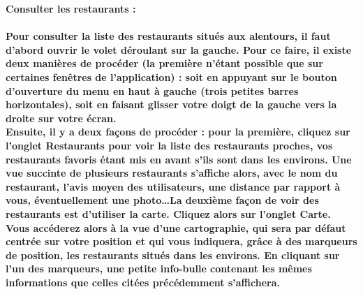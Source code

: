\begin{description}
    \item \bf{Consulter les restaurants :} \\ \\
        Pour consulter la liste des restaurants situés aux alentours, il faut d'abord ouvrir le volet déroulant sur la gauche. Pour ce faire, il existe deux manières de procéder (la première n'étant possible que sur certaines fenêtres de l’application) : soit en appuyant sur le bouton d'ouverture du menu en haut à gauche (trois petites barres horizontales), soit en faisant glisser votre doigt de la gauche vers la droite sur votre écran. \\
        Ensuite, il y a deux façons de procéder : pour la première, cliquez sur l'onglet \og{}Restaurants\fg{} pour voir la liste des restaurants proches, vos restaurants favoris étant mis en avant s'ils sont dans les environs. Une vue succinte de plusieurs restaurants s'affiche alors, avec le nom du restaurant, l'avis moyen des utilisateurs, une distance par rapport à vous, éventuellement une photo\dots La deuxième façon de voir des restaurants est d'utiliser la carte. Cliquez alors sur l’onglet \og{}Carte\fg{}. Vous accéderez alors à la vue d'une cartographie, qui sera par défaut centrée sur votre position et qui vous indiquera, grâce à des marqueurs de position, les restaurants situés dans les environs. En cliquant sur l'un des marqueurs, une petite info-bulle contenant les mêmes informations que celles citées précédemment s’affichera. \\


\end{description}

